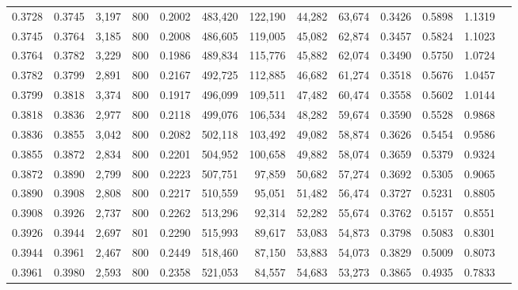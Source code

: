 \begin{tabular}{rrrrrrrrrrrrr}
0.3728 & 0.3745 &  3,197 &   800 &                                     0.2002 & 483,420 & 122,190 &  44,282 &  63,674 & 0.3426 & 0.5898 & 1.1319 \\
0.3745 & 0.3764 &  3,185 &   800 &                                     0.2008 & 486,605 & 119,005 &  45,082 &  62,874 & 0.3457 & 0.5824 & 1.1023 \\
0.3764 & 0.3782 &  3,229 &   800 &                                     0.1986 & 489,834 & 115,776 &  45,882 &  62,074 & 0.3490 & 0.5750 & 1.0724 \\
0.3782 & 0.3799 &  2,891 &   800 &                                     0.2167 & 492,725 & 112,885 &  46,682 &  61,274 & 0.3518 & 0.5676 & 1.0457 \\
0.3799 & 0.3818 &  3,374 &   800 &                                     0.1917 & 496,099 & 109,511 &  47,482 &  60,474 & 0.3558 & 0.5602 & 1.0144 \\
0.3818 & 0.3836 &  2,977 &   800 &                                     0.2118 & 499,076 & 106,534 &  48,282 &  59,674 & 0.3590 & 0.5528 & 0.9868 \\
0.3836 & 0.3855 &  3,042 &   800 &                                     0.2082 & 502,118 & 103,492 &  49,082 &  58,874 & 0.3626 & 0.5454 & 0.9586 \\
0.3855 & 0.3872 &  2,834 &   800 &                                     0.2201 & 504,952 & 100,658 &  49,882 &  58,074 & 0.3659 & 0.5379 & 0.9324 \\
0.3872 & 0.3890 &  2,799 &   800 &                                     0.2223 & 507,751 &  97,859 &  50,682 &  57,274 & 0.3692 & 0.5305 & 0.9065 \\
0.3890 & 0.3908 &  2,808 &   800 &                                     0.2217 & 510,559 &  95,051 &  51,482 &  56,474 & 0.3727 & 0.5231 & 0.8805 \\
0.3908 & 0.3926 &  2,737 &   800 &                                     0.2262 & 513,296 &  92,314 &  52,282 &  55,674 & 0.3762 & 0.5157 & 0.8551 \\
0.3926 & 0.3944 &  2,697 &   801 &                                     0.2290 & 515,993 &  89,617 &  53,083 &  54,873 & 0.3798 & 0.5083 & 0.8301 \\
0.3944 & 0.3961 &  2,467 &   800 &                                     0.2449 & 518,460 &  87,150 &  53,883 &  54,073 & 0.3829 & 0.5009 & 0.8073 \\
0.3961 & 0.3980 &  2,593 &   800 &                                     0.2358 & 521,053 &  84,557 &  54,683 &  53,273 & 0.3865 & 0.4935 & 0.7833 \\

\end{tabular}
